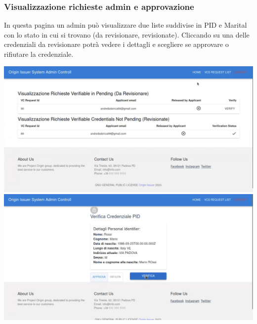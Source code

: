 \subsubsection{Visualizzazione richieste admin e approvazione} 
In questa pagina un admin può visualizzare due liste suddivise in PID e Marital con lo stato in cui si trovano (da revisionare, revisionate). Cliccando su una 
delle credenziali da revisionare potrà vedere i dettagli e scegliere se approvare o rifiutare la credenziale.
\begin{center}
\includegraphics[scale = 0.2]{./res/img/issuer/lista/admin/listaAdmin1.png}
\includegraphics[scale = 0.2]{./res/img/issuer/lista/admin/listaAdmin2.png}    
\end{center}

\clearpage


